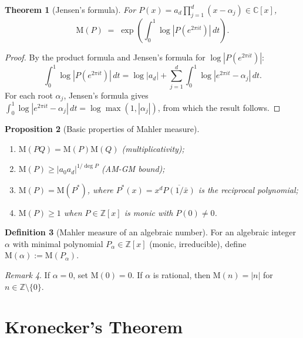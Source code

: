 \documentclass[12pt,a4paper]{amsart}
\newtheorem{theorem}{Theorem}[section]
\newtheorem{proposition}[theorem]{Proposition}
\theoremstyle{definition}
\newtheorem{definition}[theorem]{Definition}
\theoremstyle{remark}
\newtheorem{remark}[theorem]{Remark}
\newcommand{\Z}{\mathbb{Z}}
\newcommand{\C}{\mathbb{C}}
\newcommand{\M}{\mathrm{M}}
\DeclareMathOperator{\deg}{deg}
\begin{document}
\begin{theorem}[Jensen's formula]
  For $P(x) = a_d \prod_{j=1}^d (x - \alpha_j) \in \C[x]$,
  \[
    \M(P) \;=\; \exp\!\left(\int_0^1 \log|P(e^{2\pi i t})|\,dt\right).
  \]
\end{theorem}

\begin{proof}
  By the product formula and Jensen's formula for $\log|P(e^{2\pi it})|$:
  \[
    \int_0^1 \log|P(e^{2\pi it})|\,dt
    = \log|a_d| + \sum_{j=1}^d \int_0^1 \log|e^{2\pi it} - \alpha_j|\,dt.
  \]
  For each root $\alpha_j$, Jensen's formula gives
  $\int_0^1 \log|e^{2\pi it} - \alpha_j|\,dt = \log\max(1, |\alpha_j|)$,
  from which the result follows.
\end{proof}

\begin{proposition}[Basic properties of Mahler measure]
  \begin{enumerate}[label=(\roman*)]
    \item $\M(PQ) = \M(P)\M(Q)$ (multiplicativity);
    \item $\M(P) \geq |a_0 a_d|^{1/\deg P}$ (AM-GM bound);
    \item $\M(P) = \M(P^\ast)$, where $P^\ast(x) = x^d \overline{P(1/\bar{x})}$
      is the reciprocal polynomial;
    \item $\M(P) \geq 1$ when $P \in \Z[x]$ is monic with $P(0) \neq 0$.
  \end{enumerate}
\end{proposition}

\begin{definition}[Mahler measure of an algebraic number]
  For an algebraic integer $\alpha$ with minimal polynomial $P_\alpha \in \Z[x]$
  (monic, irreducible), define $\M(\alpha) := \M(P_\alpha)$.
\end{definition}

\begin{remark}
  If $\alpha = 0$, set $\M(0) = 0$. If $\alpha$ is rational, then
  $\M(n) = |n|$ for $n \in \Z\setminus\{0\}$.
\end{remark}

\section{Kronecker's Theorem}\label{sec:kronecker}
\end{document}
